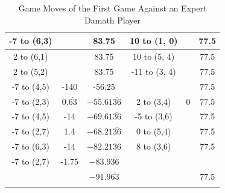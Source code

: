\begin{appendices}
\begin{longtable}[H]{cccccc}
     -7 to (6,3) &      &  83.75    &  10 to (1, 0) &      &  77.5    \\ \hline
      2 to (6,1) &      &  83.75    &  10 to (5, 4) &      &  77.5    \\ \hline
      2 to (5,2) &      &  83.75    & -11 to (3, 4) &      &  77.5    \\ \hline
     -7 to (4,5) &  -140  &  -56.25  &                &      &  77.5    \\ \hline
     -7 to (2,3) &  $0.\overline{63}$   &  $-55.61\overline{36}$   &   2 to (3,4)  &  0    &  77.5    \\ \hline
     -7 to (4,5) &  -14    &   $-69.61\overline{36}$&  -5 to (3,6)  &      &  77.5    \\ \hline
     -7 to (2,7) &  1.4    &  $-68.21\overline{36}$   &   0 to (5,4)  &      &  77.5    \\ \hline
     -7 to (6,3) &  -14    & $-82.21\overline{36}$     &   8 to (3,6)  &      &  77.5    \\ \hline
     -7 to (2,7) &  -1.75    &  $-83.9\overline{36}$   &               &      &      \\ \hline\hline 
                 &           &  $-91.9\overline{63}$   &               &      & 77.5  \\ \hline 
    \caption{Game Moves of the First Game Against an Expert Damath Player}
    \label{tab:first-game}
\end{longtable}
\endgroup


\end{appendices}
